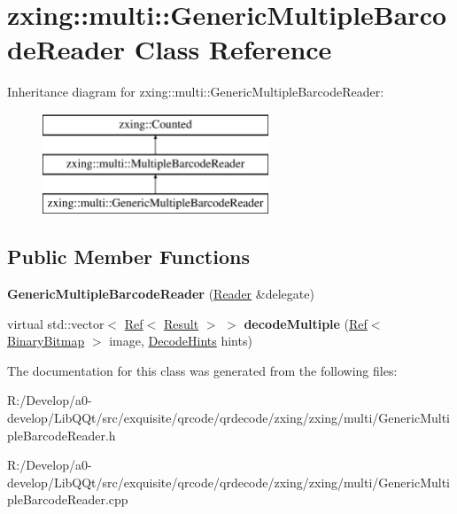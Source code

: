 \hypertarget{classzxing_1_1multi_1_1_generic_multiple_barcode_reader}{}\section{zxing\+:\+:multi\+:\+:Generic\+Multiple\+Barcode\+Reader Class Reference}
\label{classzxing_1_1multi_1_1_generic_multiple_barcode_reader}
Inheritance diagram for zxing\+:\+:multi\+:\+:Generic\+Multiple\+Barcode\+Reader\+:\begin{figure}[H]
\begin{center}
\leavevmode
\includegraphics[height=3.000000cm]{classzxing_1_1multi_1_1_generic_multiple_barcode_reader}
\end{center}
\end{figure}
\subsection*{Public Member Functions}
\begin{DoxyCompactItemize}
\item 
\mbox{\label{classzxing_1_1multi_1_1_generic_multiple_barcode_reader_adcc80852be69bc32881d12d389d431ac}} 
{\bfseries Generic\+Multiple\+Barcode\+Reader} (\mbox{\hyperlink{classzxing_1_1_reader}{Reader}} \&delegate)
\item 
\mbox{\label{classzxing_1_1multi_1_1_generic_multiple_barcode_reader_ad584588b93ca3da802a0204077b21ee8}} 
virtual std\+::vector$<$ \mbox{\hyperlink{classzxing_1_1_ref}{Ref}}$<$ \mbox{\hyperlink{classzxing_1_1_result}{Result}} $>$ $>$ {\bfseries decode\+Multiple} (\mbox{\hyperlink{classzxing_1_1_ref}{Ref}}$<$ \mbox{\hyperlink{classzxing_1_1_binary_bitmap}{Binary\+Bitmap}} $>$ image, \mbox{\hyperlink{classzxing_1_1_decode_hints}{Decode\+Hints}} hints)
\end{DoxyCompactItemize}


The documentation for this class was generated from the following files\+:\begin{DoxyCompactItemize}
\item 
R\+:/\+Develop/a0-\/develop/\+Lib\+Q\+Qt/src/exquisite/qrcode/qrdecode/zxing/zxing/multi/Generic\+Multiple\+Barcode\+Reader.\+h\item 
R\+:/\+Develop/a0-\/develop/\+Lib\+Q\+Qt/src/exquisite/qrcode/qrdecode/zxing/zxing/multi/Generic\+Multiple\+Barcode\+Reader.\+cpp\end{DoxyCompactItemize}
